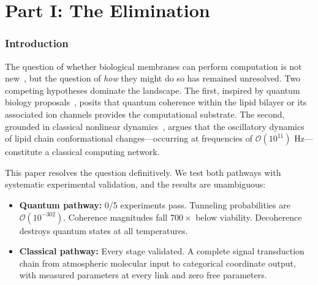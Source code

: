 \documentclass[12pt]{article}
\theoremstyle{definition}
\theoremstyle{remark}
\begin{document}

\part*{Part I: The Elimination}

\section{Introduction}
\label{sec:introduction}

The question of whether biological membranes can perform computation is not new~\citep{paun2000membrane, lipowsky1995structure}, but the question of \emph{how} they might do so has remained unresolved. Two competing hypotheses dominate the landscape. The first, inspired by quantum biology proposals~\citep{penrose1989emperor, hameroff1996orchestrated, lambert2013quantum}, posits that quantum coherence within the lipid bilayer or its associated ion channels provides the computational substrate. The second, grounded in classical nonlinear dynamics~\citep{kuramoto1984chemical, strogatz2000nonlinear}, argues that the oscillatory dynamics of lipid chain conformational changes---occurring at frequencies of $\mathcal{O}(10^{11})$ Hz---constitute a classical computing network.

This paper resolves the question definitively. We test both pathways with systematic experimental validation, and the results are unambiguous:

\begin{itemize}[leftmargin=2em]
    \item \textbf{Quantum pathway:} 0/5 experiments pass. Tunneling probabilities are $\mathcal{O}(10^{-302})$. Coherence magnitudes fall $700\times$ below viability. Decoherence destroys quantum states at all temperatures.
    \item \textbf{Classical pathway:} Every stage validated. A complete signal transduction chain from atmospheric molecular input to categorical coordinate output, with measured parameters at every link and zero free parameters.
\end{itemize}
\end{document}

